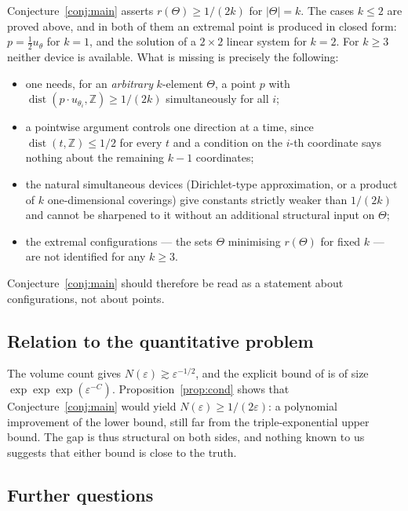 \documentclass[11pt]{article}
\theoremstyle{plain}
\theoremstyle{definition}
\theoremstyle{remark}
\newcommand{\dZ}{\operatorname{dist}}
\newcommand{\Z}{\mathbb{Z}}
\begin{document}
Conjecture~\ref{conj:main} asserts $r(\Theta)\ge1/(2k)$ for $|\Theta|=k$. The cases $k\le2$ are proved
above, and in both of them an extremal point is produced in closed form: $p=\tfrac12u_\theta$ for $k=1$,
and the solution of a $2\times2$ linear system for $k=2$. For $k\ge3$ neither device is available. What
is missing is precisely the following:
\begin{itemize}
\item one needs, for an \emph{arbitrary} $k$-element $\Theta$, a point $p$ with
$\dZ(p\cdot u_{\theta_i},\Z)\ge1/(2k)$ simultaneously for all $i$;
\item a pointwise argument controls one direction at a time, since $\dZ(t,\Z)\le1/2$ for every $t$ and
a condition on the $i$-th coordinate says nothing about the remaining $k-1$ coordinates;
\item the natural simultaneous devices (Dirichlet-type approximation, or a product of $k$
one-dimensional coverings) give constants strictly weaker than $1/(2k)$ and cannot be sharpened to it
without an additional structural input on $\Theta$;
\item the extremal configurations --- the sets $\Theta$ minimising $r(\Theta)$ for fixed $k$ --- are
not identified for any $k\ge3$.
\end{itemize}
Conjecture~\ref{conj:main} should therefore be read as a statement about configurations, not about
points.

\subsection{Relation to the quantitative problem}

The volume count gives $N(\varepsilon)\gtrsim\varepsilon^{-1/2}$, and the explicit bound of
\cite{kravitzleng2025} is of size $\exp\exp\exp(\varepsilon^{-C})$. Proposition~\ref{prop:cond} shows
that Conjecture~\ref{conj:main} would yield $N(\varepsilon)\ge1/(2\varepsilon)$: a polynomial
improvement of the lower bound, still far from the triple-exponential upper bound. The gap is thus
structural on both sides, and nothing known to us suggests that either bound is close to the truth.

\subsection{Further questions}
\end{document}
